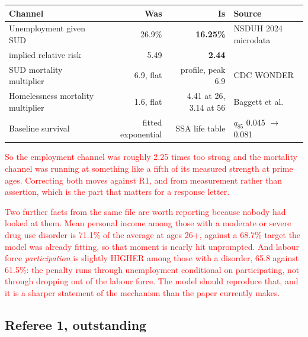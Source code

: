 \documentclass[11pt]{article}
\newcommand{\nw}[1]{\textcolor{red}{#1}}
\begin{document}
{\color{red}\begin{center}\begin{tabular}{lrrl}
\toprule
Channel & Was & Is & Source\\
\midrule
Unemployment given SUD & 26.9\% & \textbf{16.25\%} & NSDUH 2024 microdata\\
\quad implied relative risk & 5.49 & \textbf{2.44} & \\
SUD mortality multiplier & 6.9, flat & profile, peak 6.9 & CDC WONDER\\
Homelessness mortality multiplier & 1.6, flat & 4.41 at 26, 3.14 at 56 & Baggett et al.\\
Baseline survival & fitted exponential & SSA life table & $q_{85}$ 0.045 $\to$ 0.081\\
\bottomrule
\end{tabular}\end{center}}

\nw{So the employment channel was roughly 2.25 times too strong and the
mortality channel was running at something like a fifth of its measured strength
at prime ages. Correcting both moves against R1, and from measurement rather
than assertion, which is the part that matters for a response letter.}

\nw{Two further facts from the same file are worth reporting because nobody had
looked at them. Mean personal income among those with a moderate or severe drug
use disorder is 71.1\% of the average at ages 26+, against a 68.7\% target the
model was already fitting, so that moment is nearly hit unprompted. And labour
force \emph{participation} is slightly HIGHER among those with a disorder, 65.8
against 61.5\%: the penalty runs through unemployment conditional on
participating, not through dropping out of the labour force. The model should
reproduce that, and it is a sharper statement of the mechanism than the paper
currently makes.}

\subsection{Referee 1, outstanding}
\end{document}
